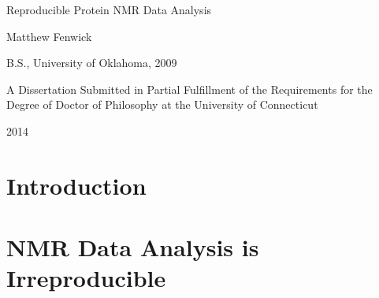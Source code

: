 \documentclass[a4paper]{report}
\begin{document}


\begin{titlepage}

Reproducible Protein NMR Data Analysis

Matthew Fenwick

B.S., University of Oklahoma, 2009

A Dissertation 
Submitted in Partial Fulfillment of the 
Requirements for the Degree of Doctor of Philosophy 
at the 
University of Connecticut 

2014
\end{titlepage}


\tableofcontents

\listoftables

\listoffigures

\chapter{Introduction}



\chapter{NMR Data Analysis is Irreproducible}




%


\end{document}
